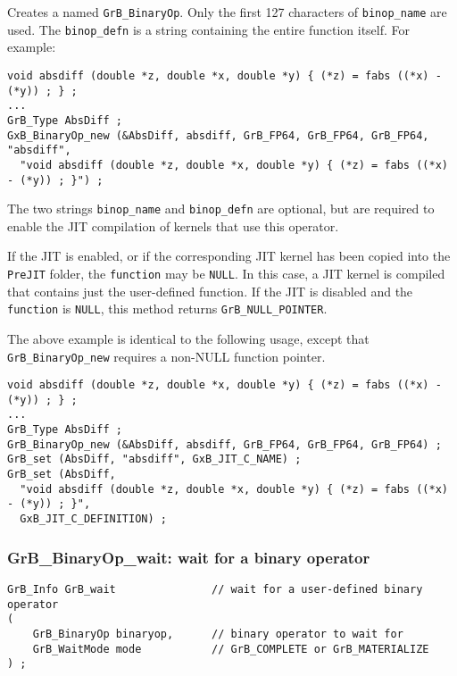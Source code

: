 \documentclass[12pt]{article}
\begin{document}
Creates a named \verb'GrB_BinaryOp'.  Only the first 127 characters of
\verb'binop_name' are used.  The \verb'binop_defn' is a string containing the
entire function itself.  For example:

{\footnotesize
\begin{verbatim}
void absdiff (double *z, double *x, double *y) { (*z) = fabs ((*x) - (*y)) ; } ;
...
GrB_Type AbsDiff ;
GxB_BinaryOp_new (&AbsDiff, absdiff, GrB_FP64, GrB_FP64, GrB_FP64, "absdiff",
  "void absdiff (double *z, double *x, double *y) { (*z) = fabs ((*x) - (*y)) ; }") ; \end{verbatim}}

The two strings \verb'binop_name' and \verb'binop_defn' are optional, but are
required to enable the JIT compilation of kernels that use this operator.

If the JIT is enabled, or if the corresponding JIT kernel has been copied
into the \verb'PreJIT' folder, the \verb'function' may be \verb'NULL'.  In this
case, a JIT kernel is compiled that contains just the user-defined function.
If the JIT is disabled and the \verb'function' is \verb'NULL', this method
returns \verb'GrB_NULL_POINTER'.

The above example is identical to the following usage, except that
\verb'GrB_BinaryOp_new' requires a non-NULL function pointer.

{\footnotesize
\begin{verbatim}
void absdiff (double *z, double *x, double *y) { (*z) = fabs ((*x) - (*y)) ; } ;
...
GrB_Type AbsDiff ;
GrB_BinaryOp_new (&AbsDiff, absdiff, GrB_FP64, GrB_FP64, GrB_FP64) ;
GrB_set (AbsDiff, "absdiff", GxB_JIT_C_NAME) ;
GrB_set (AbsDiff,
  "void absdiff (double *z, double *x, double *y) { (*z) = fabs ((*x) - (*y)) ; }",
  GxB_JIT_C_DEFINITION) ;\end{verbatim}}

\subsubsection{{\sf GrB\_BinaryOp\_wait:} wait for a binary operator}
\label{binaryop_wait}

\begin{mdframed}[userdefinedwidth=6in]
{\footnotesize
\begin{verbatim}
GrB_Info GrB_wait               // wait for a user-defined binary operator
(
    GrB_BinaryOp binaryop,      // binary operator to wait for
    GrB_WaitMode mode           // GrB_COMPLETE or GrB_MATERIALIZE
) ;
\end{verbatim}
}\end{mdframed}
\end{document}
